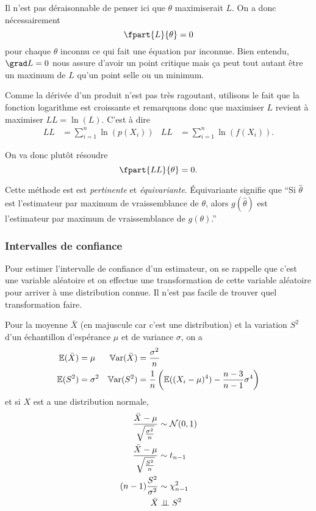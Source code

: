 Il n'est pas déraisonnable de penser ici que $\theta$ maximiserait $L$.
On a donc nécessairement
\[ \fpart{L}{\theta} = 0 \]
pour chaque $\theta$ inconnu ce qui fait une équation par inconnue.
Bien entendu, $\grad L = 0$ nous assure d'avoir un point critique mais ça peut tout
autant être un maximum de $L$ qu'un point selle ou un minimum.

Comme la dérivée d'un produit n'est pas très ragoutant,
utilisons le fait que la fonction logarithme est croissante et remarquons
donc que maximiser $L$ revient à maximiser $LL = \ln(L)$. C'est à dire
\begin{align*}
  LL & = \sum_{i=1}^n \ln(p(X_i)) & LL & = \sum_{i=1}^n \ln(f(X_i)).
\end{align*}

On va donc plutôt résoudre
\[ \fpart{LL}{\theta} = 0. \]

Cette méthode est est \emph{pertinente} et \emph{équivariante}.
Équivariante signifie que
``Si $\hat{\theta}$ est l'estimateur par maximum de vraissemblance de $\theta$,
alors $g(\hat{\theta})$ est l'estimateur par maximum de vraissemblance
de $g(\theta)$.''

\subsubsection{Intervalles de confiance}
Pour estimer l'intervalle de confiance d'un estimateur,
on se rappelle que c'est une variable aléatoire et on
effectue une transformation de cette variable aléatoire
pour arriver à une distribution connue.
Il n'est pas facile de trouver quel transformation faire.

Pour la moyenne $\bar{X}$ (en majuscule car c'est une distribution)
et la variation $S^2$ d'un échantillon d'espérance $\mu$ et de variance $\sigma$, on a
\begin{align*}
  \mathbb{E}(\bar{X}) & = \mu & \operatorname{\mathbb{V}ar}(\bar{X}) & = \frac{\sigma^2}{n}\\
  \mathbb{E}(S^2) & = \sigma^2 & \operatorname{\mathbb{V}ar}(S^2) & = \frac{1}{n}\left(\mathbb{E}((X_i-\mu)^4)-\frac{n-3}{n-1}\sigma^4\right)
\end{align*}
et si $X$ est a une distribution normale,
\begin{align*}
  \frac{\bar{X} - \mu}{\sqrt{\frac{\sigma^2}{n}}} & \sim \mathcal{N}(0, 1)\\
  \frac{\bar{X} - \mu}{\sqrt{\frac{S^2}{n}}} & \sim t_{n-1}\\
  (n-1)\frac{S^2}{\sigma^2} & \sim \chi_{n-1}^2\\
  \bar{X} & \perp\!\!\!\perp S^2\\
\end{align*}

